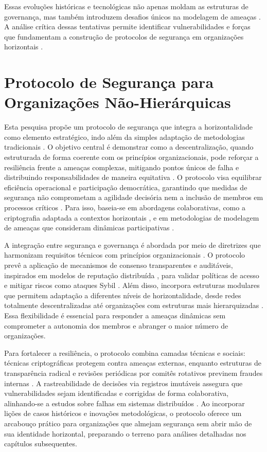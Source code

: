 Essas evoluções históricas e tecnológicas não apenas moldam as estruturas
de governança, mas também introduzem desafios únicos na modelagem de
ameaças \cite{DoArtifactsHavePolitics, Democraciaeoscodigosinvisiveis}. A análise crítica dessas tentativas permite identificar
vulnerabilidades e forças que fundamentam a construção de protocolos de
segurança em organizações horizontais \cite{Colbac}.

\section{Protocolo de Segurança para Organizações Não-Hierárquicas}
\label{sec:objetivos_pesquisa}

Esta pesquisa propõe um protocolo de segurança que integra a horizontalidade
como elemento estratégico, indo além da simples adaptação de metodologias
tradicionais \cite{Colbac}. O objetivo central é demonstrar como a descentralização, quando
estruturada de forma coerente com os princípios organizacionais, pode reforçar a
resiliência frente a ameaças complexas, mitigando pontos únicos de falha e
distribuindo responsabilidades de maneira equitativa \cite{ThreatModelingdesigningForSecurity}.
O protocolo visa equilibrar eficiência operacional e participação democrática, garantindo que
medidas de segurança não comprometam a agilidade decisória nem a inclusão de
membros em processos críticos \cite{Reputation-basedDAO}. Para isso, baseia-se em abordagens colaborativas,
como a criptografia adaptada a contextos horizontais \cite{Colbac}, e em
metodologias de modelagem de ameaças que consideram dinâmicas participativas
\cite{ParticipatoryThreatModelling}.

A integração entre segurança e governança é abordada por meio de diretrizes que
harmonizam requisitos técnicos com princípios organizacionais \cite{ParticipatoryThreatModelling}.
O protocolo prevê a aplicação de mecanismos de consenso transparentes e auditáveis, inspirados em
modelos de reputação distribuída \cite{Reputation-basedDAO}, para validar
políticas de acesso e mitigar riscos como ataques Sybil
\cite{MitigationSybilAttack}. Além disso, incorpora estruturas modulares que
permitem adaptação a diferentes níveis de horizontalidade, desde redes
totalmente descentralizadas até organizações com estruturas mais hierarquizadas
\cite{Colbac}. Essa flexibilidade é essencial para responder a ameaças
dinâmicas sem comprometer a autonomia dos membros e abranger o maior número de
organizações.

Para fortalecer a resiliência, o protocolo combina camadas técnicas e sociais:
técnicas criptográficas protegem contra ameaças externas, enquanto
estruturas de transparência radical e revisões periódicas por comitês
rotativos previnem fraudes internas \cite{EverydayRevolutions}. A rastreabilidade de decisões via
registros imutáveis assegura que vulnerabilidades sejam
identificadas e corrigidas de forma colaborativa, alinhando-se a estudos sobre
falhas em sistemas distribuídos \cite{Reputation-basedDAO}. Ao incorporar lições
de casos históricos e inovações metodológicas, o protocolo oferece um arcabouço
prático para organizações que almejam segurança sem abrir mão de sua identidade
horizontal, preparando o terreno para análises detalhadas nos capítulos
subsequentes.


